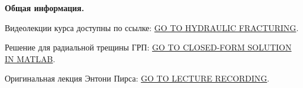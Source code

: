 \documentclass[main.tex]{subfiles}
\begin{document}
\textbf{Общая информация.}

Видеолекции курса доступны по ссылке: \href{https://youtube.com/playlist?list=PLipUmK_65GXEpFTHhfJBaiiv7XiwMg-PM}{GO TO HYDRAULIC FRACTURING}.

Решение для радиальной трещины ГРП: \href{https://datadryad.org/stash/dataset/doi:10.5061/dryad.gh469}{GO TO CLOSED-FORM SOLUTION IN MATLAB}.

Оригинальная лекция Энтони Пирса: \href{https://www.youtube.com/watch?v=PXfy5f9kWh4}{GO TO LECTURE RECORDING}.
\end{document}
